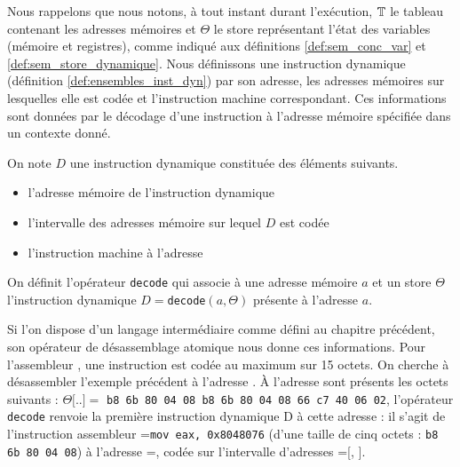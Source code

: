 Nous rappelons que nous notons, à tout instant durant l'exécution, $\mathbb T$ le tableau contenant les adresses mémoires et $\Theta$ le store représentant l'état des variables (mémoire et registres), comme indiqué aux définitions \ref{def:sem_conc_var} et \ref{def:sem_store_dynamique}.
Nous définissons une instruction dynamique (définition \ref{def:ensembles_inst_dyn}) par son adresse, les adresses mémoires sur lesquelles elle est codée et l'instruction machine correspondant. Ces informations sont données par le décodage d'une instruction à l'adresse mémoire spécifiée dans un contexte donné. 

\begin{defi}
On note $D$ une instruction dynamique constituée des éléments suivants.
\begin{itemize}
 \item {} l'adresse mémoire de l'instruction dynamique
 \item {} l'intervalle des adresses mémoire sur lequel $D$ est codée
 \item {} l'instruction machine à l'adresse 
\end{itemize}
On définit l'opérateur \texttt{decode} qui associe à une adresse mémoire $a$ et un store $\Theta$ l'instruction dynamique $D=$\texttt{decode}$(a, \Theta)$ présente à l'adresse $a$.
\label{def:ensembles_inst_dyn}
\end{defi}

Si l'on dispose d'un langage intermédiaire comme défini au chapitre précédent, son opérateur de désassemblage atomique nous donne ces informations. Pour l'assembleur \xq, une instruction est codée au maximum sur 15 octets.
On cherche à désassembler l'exemple précédent à l'adresse . À l'adresse  sont présents les octets suivants : $\Theta[$..$]=$ \texttt{b8 6b 80 04 08 b8 6b 80 04 08 66 c7 40 06 02}, l'opérateur \texttt{decode} renvoie la première instruction dynamique D à cette adresse : il s'agit de l'instruction assembleur =\texttt{mov eax, 0x8048076} (d'une taille de cinq octets : \texttt{b8 6b 80 04 08}) à l'adresse =, codée sur l'intervalle d'adresses =[, ].

